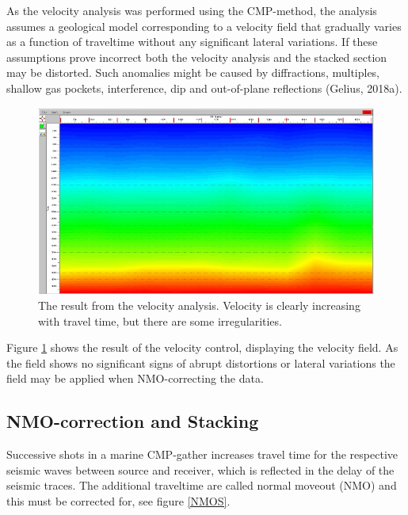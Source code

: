 \documentclass[10pt,a4paper]{article}
\begin{document}
As the velocity analysis was performed using the CMP-method, the analysis assumes a geological model corresponding to a velocity field that gradually varies as a function of traveltime without any significant lateral variations. If these assumptions prove incorrect both the velocity analysis and the stacked section may be distorted. Such anomalies might be caused by diffractions, multiples, shallow gas pockets, interference, dip and out-of-plane reflections (Gelius, 2018a). 

\begin{figure}[H]
\includegraphics[width=\textwidth]{Velo_anal_smooth.jpg}
\caption{The result from the velocity analysis. Velocity is clearly increasing with travel time, but there are some irregularities.}
\label{Smooth}
\end{figure}

\noindent Figure \ref{Smooth} shows the result of the velocity control, displaying the velocity field. As the field shows no significant signs of abrupt distortions or lateral variations the field may be applied when NMO-correcting the data.


\subsection{NMO-correction and Stacking}

Successive shots in a marine CMP-gather increases travel time for the respective seismic waves between source and receiver, which is reflected in the delay of the seismic traces. The additional traveltime are called normal moveout (NMO) and this must be corrected for, see figure \ref{NMOS}.
\end{document}
